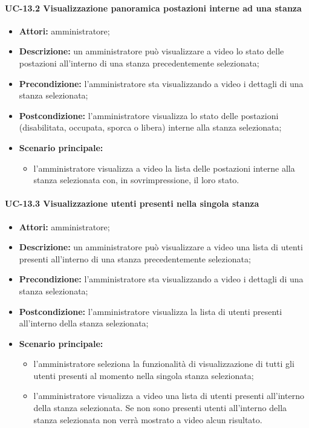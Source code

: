 \paragraph{UC-13.2 Visualizzazione panoramica postazioni interne ad una stanza}
\begin{itemize}
    \item \textbf{Attori:} amministratore;
    \item \textbf{Descrizione:} un amministratore pu\`{o} visualizzare a video lo stato delle postazioni all'interno di una stanza precedentemente selezionata;
    \item \textbf{Precondizione:} l'amministratore sta visualizzando a video i dettagli di una stanza selezionata;
    \item \textbf{Postcondizione:} l'amministratore visualizza lo stato delle postazioni (disabilitata, occupata, sporca o libera) interne alla stanza selezionata;
    \item \textbf{Scenario principale:}
    \begin{itemize}
        \item l'amministratore visualizza a video la lista delle postazioni interne alla stanza selezionata con, in sovrimpressione, il loro stato.
    \end{itemize}
\end{itemize}

\paragraph{UC-13.3 Visualizzazione utenti presenti nella singola stanza}
\begin{itemize}
    \item \textbf{Attori:} amministratore;
    \item \textbf{Descrizione:} un amministratore pu\`{o} visualizzare a video una lista di utenti presenti all'interno di una stanza precedentemente selezionata;
    \item \textbf{Precondizione:} l'amministratore sta visualizzando a video i dettagli di una stanza selezionata;
    \item \textbf{Postcondizione:} l'amministratore visualizza la lista di utenti presenti all'interno della stanza selezionata;
    \item \textbf{Scenario principale:}
    \begin{itemize}
        \item l'amministratore seleziona la funzionalità di visualizzazione di tutti gli utenti presenti al momento nella singola stanza selezionata;
        \item l'amministratore visualizza a video una lista di utenti presenti all'interno della stanza selezionata. Se non sono presenti utenti all'interno della stanza selezionata non verrà mostrato a video alcun risultato.
    \end{itemize}
\end{itemize}


